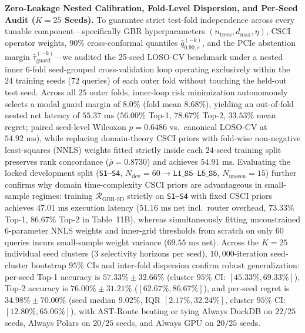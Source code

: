\documentclass[10pt,a4paper]{article}
\begin{document}
\textbf{Zero-Leakage Nested Calibration, Fold-Level Dispersion, and Per-Seed Audit ($K=25$ Seeds).} To guarantee strict test-fold independence across every tunable component---specifically GBR hyperparameters $(n_{\text{trees}}, d_{\text{max}}, \eta)$, $\text{CSCI}$ operator weights, $90\%$ cross-conformal quantiles $\hat{q}_{0.90,e}^{(-k)}$, and the PCIe abstention margin $\hat{\tau}_{\text{guard}}^{(-k)}$---we audited the 25-seed LOSO-CV benchmark under a nested inner 6-fold seed-grouped cross-validation loop operating exclusively within the $24$ training seeds ($72$ queries) of each outer fold without touching the held-out test seed. Across all $25$ outer folds, inner-loop risk minimization autonomously selects a modal guard margin of $8.0\%$ (fold mean $8.68\%$), yielding an out-of-fold nested net latency of $55.37\text{ ms}$ ($56.00\%$ Top-1, $78.67\%$ Top-2, $33.53\%$ mean regret; paired seed-level Wilcoxon $p=0.6486$ vs.\ canonical LOSO-CV at $54.92\text{ ms}$), while replacing domain-theory $\text{CSCI}$ priors with fold-wise non-negative least-squares (NNLS) weights fitted strictly inside each $24$-seed training split preserves rank concordance ($\bar{\rho}=0.8730$) and achieves $54.91\text{ ms}$. Evaluating the locked development split (\texttt{S1--S4}, $N_{\text{dev}}=60 \rightarrow \texttt{L1\_S5--L5\_S5}$, $N_{\text{unseen}}=15$) further confirms why domain time-complexity $\text{CSCI}$ priors are advantageous in small-sample regimes: training $\mathcal{R}_{\text{GBR-9D}}$ strictly on \texttt{S1--S4} with fixed $\text{CSCI}$ priors achieves $47.01\text{ ms}$ execution latency ($51.16\text{ ms}$ net incl.\ router overhead, $73.33\%$ Top-1, $86.67\%$ Top-2 in Table~11B), whereas simultaneously fitting unconstrained $6$-parameter NNLS weights and inner-grid thresholds from scratch on only $60$ queries incurs small-sample weight variance ($69.55\text{ ms}$ net). Across the $K=25$ individual seed clusters ($3$ selectivity horizons per seed), $10{,}000$-iteration seed-cluster bootstrap $95\%$ CIs and inter-fold dispersion confirm robust generalization: per-seed Top-1 accuracy is $57.33\% \pm 32.66\%$ (cluster $95\%$ CI: $[45.33\%, 69.33\%]$), Top-2 accuracy is $76.00\% \pm 31.21\%$ ($[62.67\%, 86.67\%]$), and per-seed regret is $34.98\% \pm 70.00\%$ (seed median $9.02\%$, IQR $[2.17\%, 32.24\%]$, cluster $95\%$ CI: $[12.80\%, 65.06\%]$), with AST-Route beating or tying Always DuckDB on $22/25$ seeds, Always Polars on $20/25$ seeds, and Always GPU on $20/25$ seeds.
\end{document}
